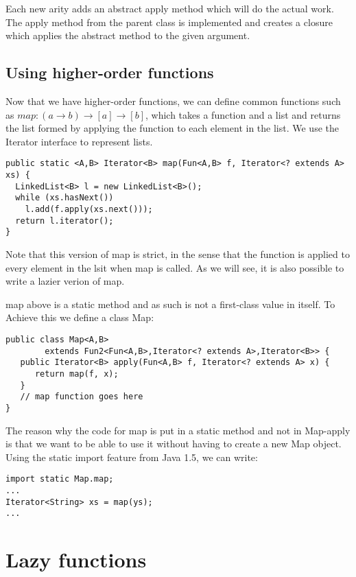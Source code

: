 \documentclass{article}
\begin{document}
Each new arity adds an abstract apply method which will do the actual work.
The apply method from the parent class is implemented and creates a
closure which applies the abstract method to the given argument.


\subsection{Using higher-order functions}

Now that we have higher-order functions, we can define common functions
such as $map : (a \rightarrow b) \rightarrow [a] \rightarrow [b]$, 
which takes a function and a list and returns the list 
formed by applying the function to each element in the list. 
We use the Iterator interface to represent lists. 

\begin{Verbatim}
public static <A,B> Iterator<B> map(Fun<A,B> f, Iterator<? extends A> xs) {
  LinkedList<B> l = new LinkedList<B>();
  while (xs.hasNext())
    l.add(f.apply(xs.next()));
  return l.iterator();
}
\end{Verbatim}

Note that this version of map is strict, in the sense that the function
is applied to every element in the lsit when map is called. As we will
see, it is also possible to write a lazier verion of map.

map above is a static method and as such is not a first-class value
in itself. To Achieve this we define a class Map:

\begin{Verbatim}
public class Map<A,B> 
        extends Fun2<Fun<A,B>,Iterator<? extends A>,Iterator<B>> {
   public Iterator<B> apply(Fun<A,B> f, Iterator<? extends A> x) {
      return map(f, x);
   }
   // map function goes here
}
\end{Verbatim}

The reason why the code for map is put in a static method and not in
Map-apply is that we want to be able to use it without having to create
a new Map object. Using the static import feature from Java 1.5, we 
can write:

\begin{Verbatim}
import static Map.map;
...
Iterator<String> xs = map(ys);
...
\end{Verbatim}


\section{Lazy functions}
\end{document}
